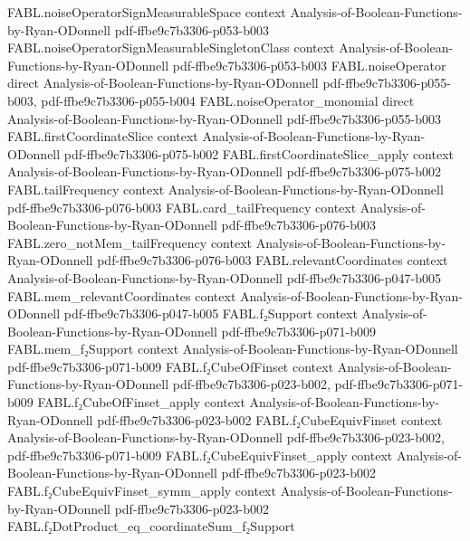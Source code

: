 \begin{theorem}
\proofstep
  {FABL.noiseOperatorSignMeasurableSpace}
  {context}
  {Analysis-of-Boolean-Functions-by-Ryan-ODonnell}
  {pdf-ffbe9c7b3306-p053-b003}
\proofstep
  {FABL.noiseOperatorSignMeasurableSingletonClass}
  {context}
  {Analysis-of-Boolean-Functions-by-Ryan-ODonnell}
  {pdf-ffbe9c7b3306-p053-b003}
\proofstep
  {FABL.noiseOperator}
  {direct}
  {Analysis-of-Boolean-Functions-by-Ryan-ODonnell}
  {pdf-ffbe9c7b3306-p055-b003,
    pdf-ffbe9c7b3306-p055-b004}
\proofstep
  {FABL.noiseOperator_monomial}
  {direct}
  {Analysis-of-Boolean-Functions-by-Ryan-ODonnell}
  {pdf-ffbe9c7b3306-p055-b003}
\proofstep
  {FABL.firstCoordinateSlice}
  {context}
  {Analysis-of-Boolean-Functions-by-Ryan-ODonnell}
  {pdf-ffbe9c7b3306-p075-b002}
\proofstep
  {FABL.firstCoordinateSlice_apply}
  {context}
  {Analysis-of-Boolean-Functions-by-Ryan-ODonnell}
  {pdf-ffbe9c7b3306-p075-b002}
\proofstep
  {FABL.tailFrequency}
  {context}
  {Analysis-of-Boolean-Functions-by-Ryan-ODonnell}
  {pdf-ffbe9c7b3306-p076-b003}
\proofstep
  {FABL.card_tailFrequency}
  {context}
  {Analysis-of-Boolean-Functions-by-Ryan-ODonnell}
  {pdf-ffbe9c7b3306-p076-b003}
\proofstep
  {FABL.zero_notMem_tailFrequency}
  {context}
  {Analysis-of-Boolean-Functions-by-Ryan-ODonnell}
  {pdf-ffbe9c7b3306-p076-b003}
\proofstep
  {FABL.relevantCoordinates}
  {context}
  {Analysis-of-Boolean-Functions-by-Ryan-ODonnell}
  {pdf-ffbe9c7b3306-p047-b005}
\proofstep
  {FABL.mem_relevantCoordinates}
  {context}
  {Analysis-of-Boolean-Functions-by-Ryan-ODonnell}
  {pdf-ffbe9c7b3306-p047-b005}
\proofstep
  {FABL.f₂Support}
  {context}
  {Analysis-of-Boolean-Functions-by-Ryan-ODonnell}
  {pdf-ffbe9c7b3306-p071-b009}
\proofstep
  {FABL.mem_f₂Support}
  {context}
  {Analysis-of-Boolean-Functions-by-Ryan-ODonnell}
  {pdf-ffbe9c7b3306-p071-b009}
\proofstep
  {FABL.f₂CubeOfFinset}
  {context}
  {Analysis-of-Boolean-Functions-by-Ryan-ODonnell}
  {pdf-ffbe9c7b3306-p023-b002,
    pdf-ffbe9c7b3306-p071-b009}
\proofstep
  {FABL.f₂CubeOfFinset_apply}
  {context}
  {Analysis-of-Boolean-Functions-by-Ryan-ODonnell}
  {pdf-ffbe9c7b3306-p023-b002}
\proofstep
  {FABL.f₂CubeEquivFinset}
  {context}
  {Analysis-of-Boolean-Functions-by-Ryan-ODonnell}
  {pdf-ffbe9c7b3306-p023-b002,
    pdf-ffbe9c7b3306-p071-b009}
\proofstep
  {FABL.f₂CubeEquivFinset_apply}
  {context}
  {Analysis-of-Boolean-Functions-by-Ryan-ODonnell}
  {pdf-ffbe9c7b3306-p023-b002}
\proofstep
  {FABL.f₂CubeEquivFinset_symm_apply}
  {context}
  {Analysis-of-Boolean-Functions-by-Ryan-ODonnell}
  {pdf-ffbe9c7b3306-p023-b002}
\proofstep
  {FABL.f₂DotProduct_eq_coordinateSum_f₂Support}

\end{theorem}
